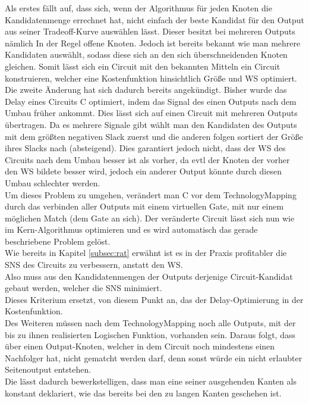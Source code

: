 \documentclass[11pt, a4paper, german]{article}
\newcommand{\TM}{TechnologyMapping }
\begin{document}
Als erstes fällt auf, dass sich, wenn der Algorithmus für jeden Knoten die Kandidatenmenge errechnet hat, nicht einfach der beste Kandidat für den Output aus seiner Tradeoff-Kurve auswählen lässt. Dieser besitzt bei mehreren Outputs nämlich In der Regel offene Knoten. 
Jedoch ist bereits bekannt wie man mehrere Kandidaten auswählt, sodass diese sich an den sich überschneidenden Knoten gleichen. Somit lässt sich ein Circuit mit den bekannten Mitteln ein Circuit konstruieren, welcher eine Kostenfunktion hinsichtlich Größe und WS optimiert. \\

Die zweite Änderung hat sich dadurch bereits angekündigt. Bisher wurde das Delay eines Circuits C optimiert, indem das Signal des einen Outputs nach dem Umbau früher ankommt. Dies lässt sich auf einen Circuit mit mehreren Outputs übertragen. Da es mehrere Signale gibt wählt man den Kandidaten des Outputs mit dem größten negativen Slack zuerst und die anderen folgen sortiert der Größe ihres Slacks nach (absteigend). Dies garantiert jedoch nicht, dass der WS des Circuits nach dem Umbau besser ist als vorher, da evtl der Knoten der vorher den WS bildete besser wird, jedoch ein anderer Output könnte durch diesen Umbau schlechter werden. \\
Um dieses Problem zu umgehen, verändert man C vor dem \TM durch das verbinden aller Outputs mit einem virtuellen Gate, mit nur einem möglichen Match (dem Gate an sich). Der veränderte Circuit lässt sich nun wie im Kern-Algorithmus optimieren und es wird automatisch das gerade beschriebene Problem gelöst.\\ 
Wie bereits in Kapitel \ref{subsec:rat}  erwähnt ist es in der Praxis profitabler die SNS des Circuits zu verbessern, anstatt den WS.\\
Also muss aus den Kandidatenmengen der Outputs derjenige Circuit-Kandidat gebaut werden, welcher die SNS minimiert.\\
 Dieses Kriterium ersetzt, von diesem Punkt an,  das der Delay-Optimierung in der Kostenfunktion.\\
 
 Des Weiteren müssen nach dem \TM noch alle Outputs, mit der bis zu ihnen realisierten Logischen Funktion, vorhanden sein. Daraus folgt, dass über einen Output-Knoten, welcher in dem Circuit noch mindestens einen Nachfolger hat, nicht gematcht werden darf, denn sonst würde ein nicht erlaubter Seitenoutput entstehen.\\
 Die lässt dadurch bewerkstelligen, dass man eine seiner ausgehenden Kanten als konstant deklariert, wie das bereits bei den zu langen Kanten geschehen ist. 
\end{document}
